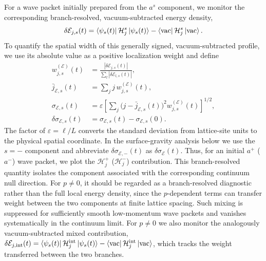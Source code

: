 \documentclass[reprint,amsmath,amssymb,aps,showkeys,superscriptaddress]{revtex4-2}
\begin{document}
For a wave packet initially prepared from the $a^s$ component, we
monitor the corresponding branch-resolved, vacuum-subtracted energy
density,
\begin{equation}
  \delta\mathcal{E}_{j,s}(t)
  =
  \bra{\psi_s(t)}
  \mathcal{H}_j^s
  \ket{\psi_s(t)}
  -
  \bra{\mathrm{vac}}
  \mathcal{H}_j^s
  \ket{\mathrm{vac}}.
  \label{eq:branch_resolved_energy}
\end{equation}
To quantify the spatial width of this generally signed,
vacuum-subtracted profile, we use its absolute value as a positive
localization weight and define
\begin{equation}
  \begin{aligned}
    w_{j,s}^{(\mathcal E)}(t)
    & =
    \frac{|\delta\mathcal E_{j,s}(t)|}
         {\sum_l|\delta\mathcal E_{l,s}(t)|},
    \\
    \bar j_{\mathcal E,s}(t)
    & =
    \sum_j j\,w_{j,s}^{(\mathcal E)}(t),
    \\
    \sigma_{\mathcal E,s}(t)
    & =
    \varepsilon
    \left[
      \sum_j
      \bigl(j-\bar j_{\mathcal E,s}(t)\bigr)^2
      w_{j,s}^{(\mathcal E)}(t)
    \right]^{1/2},
    \\
    \delta\sigma_{\mathcal E,s}(t)
    & =
    \sigma_{\mathcal E,s}(t)-\sigma_{\mathcal E,s}(0).
  \end{aligned}
  \label{eq:energy_weighted_width}
\end{equation}
The factor of \(\varepsilon=\ell/L\) converts the standard deviation
from lattice-site units to the physical spatial coordinate. In the
surface-gravity analysis below we use the \(s=-\) component and
abbreviate \(\delta\sigma_{\mathcal E,-}(t)\) as
\(\delta\sigma_{\mathcal E}(t)\).
Thus, for an initial $a^+$ ($a^-$) wave packet, we plot the
$\mathcal{H}_j^+$ ($\mathcal{H}_j^-$) contribution. This
branch-resolved quantity isolates the component associated with the
corresponding continuum null direction. For $p\neq0$, it should be regarded as a branch-resolved
diagnostic rather than the full local energy density, since the
$p$-dependent terms can transfer weight between the two components
at finite lattice spacing. Such mixing is suppressed for sufficiently
smooth low-momentum wave packets and vanishes systematically in the
continuum limit. For $p\neq0$ we also monitor the analogously
vacuum-subtracted mixed contribution,
$\delta\mathcal{E}_{j,\mathrm{int}}(t)
=\bra{\psi_s(t)}\mathcal{H}_j^{\mathrm{int}}\ket{\psi_s(t)}
-\bra{\mathrm{vac}}\mathcal{H}_j^{\mathrm{int}}\ket{\mathrm{vac}}$,
which tracks the weight transferred between the two branches.
\end{document}
